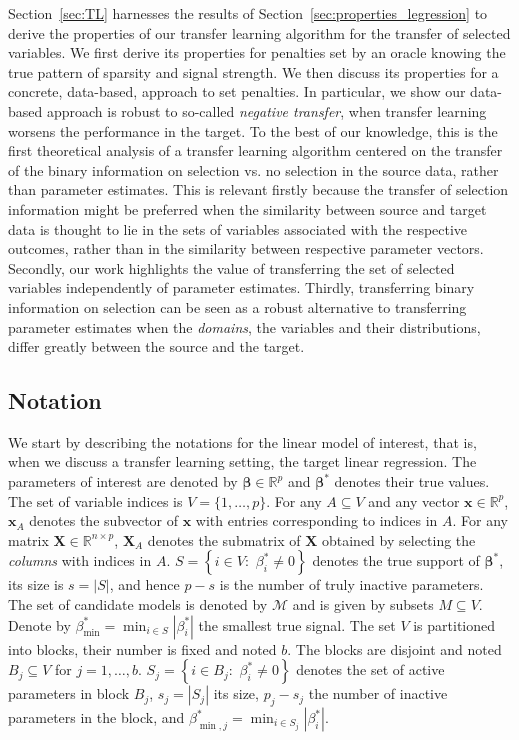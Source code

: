 \documentclass[
  12pt]{article}
\newcommand{\R}{\mathbb{R}}
\newcommand{\M}{\mathcal{M}}
\newcommand{\bx}{\mathbf{x}}
\newcommand{\bbeta}{\boldsymbol{\beta}}
\newcommand{\bX}{\mathbf{X}}
\begin{document}
Section~\ref{sec:TL} harnesses the results of Section~\ref{sec:properties_legression} to derive the properties of our transfer learning algorithm for the transfer of selected variables. We first derive its properties for penalties set by an oracle knowing the true pattern of sparsity and signal strength. We then discuss its properties for a concrete, data-based, approach to set penalties. In particular, we show our data-based approach is robust to so-called \textit{negative transfer}, when transfer learning worsens the performance in the target. To the best of our knowledge, this is the first theoretical analysis of a transfer learning algorithm centered on the transfer of the binary information on selection vs. no selection in the source data, rather than parameter estimates. This is relevant firstly because the transfer of selection information might be preferred when the similarity between source and target data is thought to lie in the sets of variables associated with the respective outcomes, rather than in the similarity between respective parameter vectors. Secondly, our work highlights the value of transferring the set of selected variables independently of parameter estimates. Thirdly, transferring binary information on selection can be seen as a robust alternative to transferring parameter estimates when the \textit{domains}, the variables and their distributions, differ greatly between the source and the target. 

\subsection{Notation}

We start by describing the notations for the linear model of interest, that is, when we discuss a transfer learning setting, the target linear regression. The parameters of interest are denoted by $\bbeta\in \R^p$  
and $\bbeta^*$ denotes their true values. The set of variable indices is $V=\{1,\ldots,p\}$. For any $A\subseteq V$ and any vector $\bx\in \R^p$, $\bx_A$ denotes the subvector of $\bx$ with entries corresponding to indices in $A$. For any matrix $\bX \in \R^{n\times p}$, $\bX_A$ denotes the submatrix of $\bX$ obtained by selecting the \emph{columns} with indices in $A$. $S=\left\{i\in V:\,\,  \beta^*_i \neq 0 \right\}$ denotes the true support of $\bbeta^*$, its size is $s=|S|$, and hence $p-s$ is the number of truly inactive parameters. The set of candidate models is denoted by $\M$ and is given by subsets $M\subseteq V$. Denote by $\beta_{\min}^*=\min_{i \in S}|\beta^*_i|$ the smallest true signal. The set $V$ is partitioned into blocks, their number is fixed and noted $b$. The blocks are disjoint and noted $B_j \subseteq V$ for $j=1,\ldots,b$. $S_j=\left\{i\in B_j:\,\,  \beta^*_i \neq 0\right\}$ denotes the set of active parameters in block $B_j$, $s_j=|S_j|$ its size, $p_j-s_j$ the number of inactive parameters in the block,
and $\beta_{\min,j}^*=\min_{i \in S_j}|\beta^*_i|$.
\end{document}
